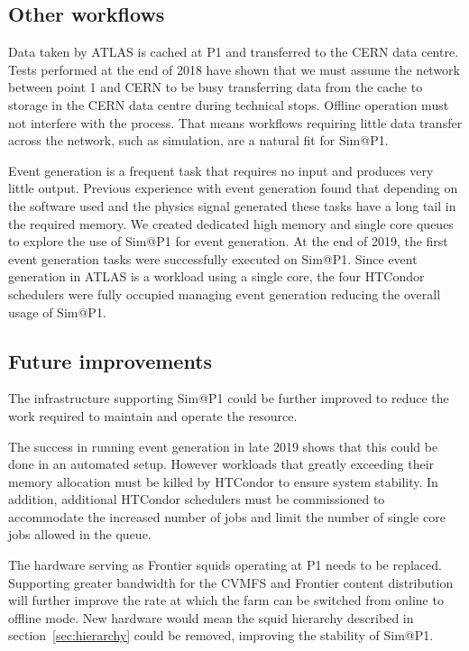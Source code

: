 \documentclass{webofc}
\begin{document}
\subsection{Other workflows}
\label{sec:evgen}
Data taken by ATLAS is cached at P1 and transferred to the CERN data
centre. Tests performed at the end of 2018 have shown that we must assume the
network between point 1 and CERN to be busy transferring data from the cache to
storage in the CERN data centre during technical stops. Offline operation must
not interfere with the process. That means workflows requiring little data
transfer across the network, such as simulation, are a natural fit for Sim@P1.

Event generation is a frequent task that requires no input and produces very
little output. Previous experience with event generation found that depending on
the software used and the physics signal generated these tasks have a long tail
in the required memory. We created dedicated high memory and single core queues
to explore the use of Sim@P1 for event generation. At the end of 2019, the first
event generation tasks were successfully executed on Sim@P1. Since event
generation in ATLAS is a workload using a single core, the four HTCondor
schedulers were fully occupied managing event generation reducing the overall
usage of Sim@P1.

\subsection{Future improvements}
The infrastructure supporting Sim@P1 could be further improved to reduce the
work required to maintain and operate the resource.

The success in running event generation in late 2019 shows that this could be
done in an automated setup. However workloads that greatly exceeding their
memory allocation must be killed by HTCondor to ensure system stability. In
addition, additional HTCondor schedulers must be commissioned to accommodate the
increased number of jobs and limit the number of single core jobs allowed in the
queue.

The hardware serving as Frontier squids operating at P1 needs to be replaced.
Supporting greater bandwidth for the CVMFS and Frontier content distribution
will further improve the rate at which the farm can be switched from online to
offline mode. New hardware would mean the squid hierarchy described in
section~\ref{sec:hierarchy} could be removed, improving the stability of Sim@P1.
\end{document}
